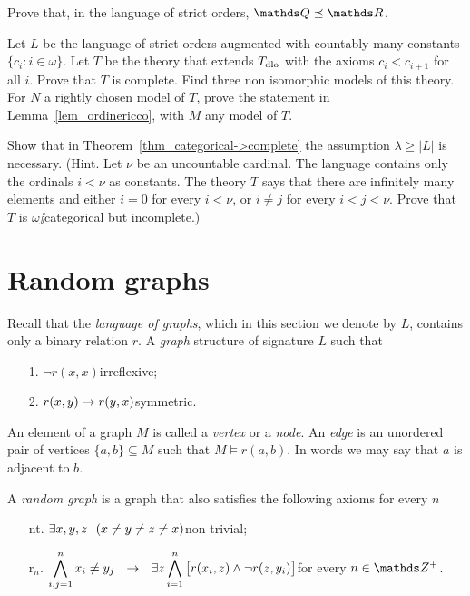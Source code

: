 \documentclass[creche.tex]{subfiles}
\begin{document}
\begin{exercise}
Prove that, in the language of strict orders, $\QQ\preceq\RR$.\QED
\end{exercise}

\begin{exercise}\label{VaughtEsempio3modelli}
Let $L$ be the language of strict orders augmented with countably many constants $\big\{c_i: i\in\omega\big\}$. Let $T$ be the theory that extends $T_{\rm dlo}$ with the axioms $c_i<c_{i+1}$ for all $i$. Prove that $T$ is complete. Find three non isomorphic models of this theory. For $N$ a rightly chosen model of $T$, prove the statement in Lemma~\ref{lem_ordinericco}, with $M$ any model of $T$.\QED
\end{exercise}


\begin{exercise}\label{categorica->completa}
Show that in Theorem~\ref{thm_categorical->complete} the assumption $\lambda\ge|L|$ is necessary. (Hint. Let $\nu$ be an uncountable cardinal. The language contains only the ordinals $i<\nu$ as constants. The theory $T$ says that there are infinitely many elements and either $i=0$ for every $i<\nu$, or $i\neq j$ for every $i<j<\nu$. Prove that $T$ is $\omega\jj$categorical but incomplete.)\QED
\end{exercise}


\section{Random graphs}
\label{randomgraph}

Recall that the \emph{language of graphs}, which in this section we denote by $L$, contains only a binary relation $r$. A \emph{graph\/} structure of signature $L$ such that

\begin{itemize}
\item[1.] $\neg r(x,x)$\hfill irreflexive;
\item[2.] $r(x,y)\rightarrow r(y,x)$\hfill symmetric.
\end{itemize}

An element of a graph $M$ is called a \emph{vertex\/} or a \emph{node}. An \emph{edge\/} is an unordered pair of vertices $\{a,b\}\subseteq M$ such that $M\models r(a,b)$. In words we may say that $a$ is adjacent to $b$.

A \emph{random graph\/} is a graph that also satisfies the following axioms for every $n$
\begin{itemize}
\item[nt.] $\exists x,y,z\ \ (x\neq y\neq z\neq x)$\hfill non trivial;
\item[r$_n$.] $\displaystyle\bigwedge^n_{i,j=1} x_i\neq y_j\ \ \imp\ \ \E z \bigwedge^n_{i=1} \big[r(x_i,z) \wedge \neg r(z,y_i)\big]$\hfill for every $n\in\ZZ^+$.
\end{itemize}
\end{document}
